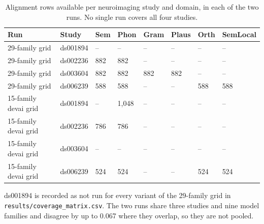 \begin{table}[t]
\centering
\small
\begin{tabular}{llllllll}
\toprule
Run & Study & Sem & Phon & Gram & Plaus & Orth & SemLocal \\
\midrule
29-family grid & ds001894 & -- & -- & -- & -- & -- & -- \\
29-family grid & ds002236 & 882 & 882 & -- & -- & -- & -- \\
29-family grid & ds003604 & 882 & 882 & 882 & 882 & -- & -- \\
29-family grid & ds006239 & 588 & 588 & -- & -- & 588 & 588 \\
15-family devai grid & ds001894 & -- & 1,048 & -- & -- & -- & -- \\
15-family devai grid & ds002236 & 786 & 786 & -- & -- & -- & -- \\
15-family devai grid & ds003604 & -- & -- & -- & -- & -- & -- \\
15-family devai grid & ds006239 & 524 & 524 & -- & -- & 524 & 524 \\
\bottomrule
\end{tabular}
\vspace{2pt}
\begin{minipage}{\linewidth}\footnotesize ds001894 is recorded as not run for every variant of the 29-family grid in \texttt{results/coverage\_matrix.csv}. The two runs share three studies and nine model families and disagree by up to 0.067 where they overlap, so they are not pooled.\end{minipage}
\caption{Alignment rows available per neuroimaging study and domain, in each of the two runs. No single run covers all four studies.}
\label{tab:t7}
\end{table}
